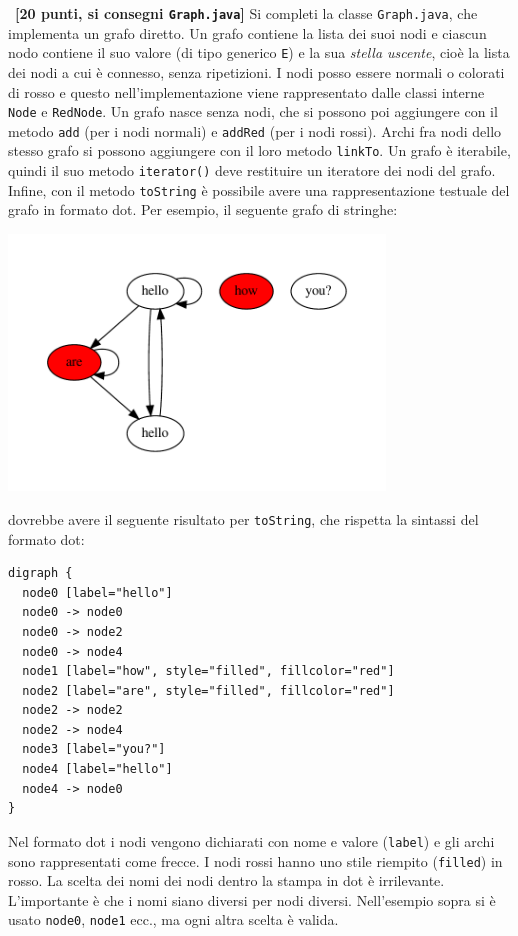 \documentclass[12pt]{article}
\newcounter{esnu}
\newenvironment{esercizio}{\medskip \noindent {\bf Esercizio\addtocounter{esnu}{1} \arabic{esnu}}}{}
\begin{document}
\begin{esercizio}~\textbf{[20 punti, si consegni \texttt{Graph.java}]}
  Si completi la classe \texttt{Graph.java}, che implementa un grafo diretto.
  Un grafo contiene la lista dei
  suoi nodi e ciascun nodo contiene il suo valore (di tipo generico \texttt{E})
  e la sua \emph{stella uscente}, cio\`e la lista dei nodi a cui \`e connesso,
  senza ripetizioni. I nodi posso essere normali o colorati di rosso
  e questo nell'implementazione viene rappresentato dalle classi interne
  \texttt{Node} e \texttt{RedNode}.
  Un grafo nasce senza nodi, che si possono poi aggiungere con il metodo
  \texttt{add} (per i nodi normali) e \texttt{addRed} (per i nodi rossi).
  Archi fra nodi dello stesso grafo si possono aggiungere con il loro metodo \texttt{linkTo}.
  Un grafo \`e iterabile, quindi il suo metodo \texttt{iterator()}
  deve restituire un iteratore dei nodi del grafo.
  Infine, con il metodo \texttt{toString}
  \`e possibile avere una rappresentazione testuale del grafo
  in formato dot. Per esempio, il seguente grafo di stringhe:
  \begin{center}
    \includegraphics[width=10cm]{g1.pdf}
  \end{center}
  dovrebbe avere il seguente risultato per \texttt{toString}, che rispetta la sintassi
  del formato dot:
\begin{verbatim}
digraph {
  node0 [label="hello"]
  node0 -> node0
  node0 -> node2
  node0 -> node4
  node1 [label="how", style="filled", fillcolor="red"]
  node2 [label="are", style="filled", fillcolor="red"]
  node2 -> node2
  node2 -> node4
  node3 [label="you?"]
  node4 [label="hello"]
  node4 -> node0
}
\end{verbatim}
%
Nel formato dot i nodi vengono dichiarati con nome e valore (\texttt{label})
e gli archi sono rappresentati come frecce. I nodi rossi hanno uno stile
riempito (\texttt{filled}) in rosso.
La scelta dei nomi dei nodi dentro la stampa in dot \`e irrilevante.
L'importante \`e che i nomi siano diversi per nodi diversi.
Nell'esempio sopra si \`e usato \texttt{node0}, \texttt{node1} ecc.,
ma ogni altra scelta \`e valida.
\end{esercizio}
\end{document}
